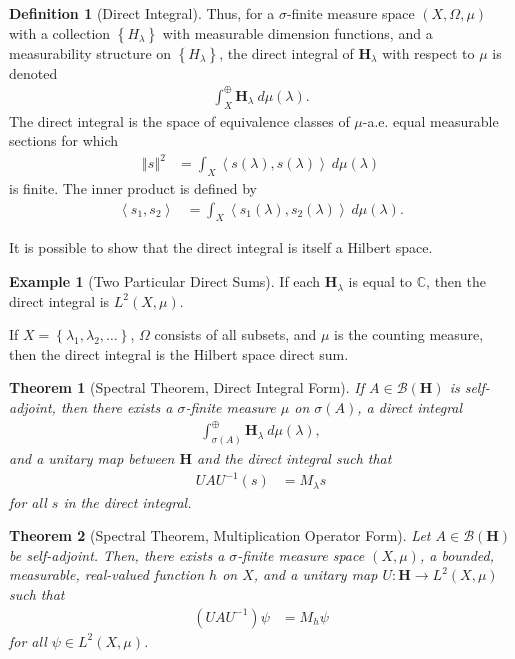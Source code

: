 \documentclass[12pt]{extarticle}
\newcommand{\C}{\mathbb{C}}
\newcommand{\set}[1]{\left\{#1\right\}}
\newcommand{\iprod}[2]{\left\langle #1,#2\right\rangle}
\newcommand{\norm}[1]{\left\Vert #1\right\Vert}
\theoremstyle{plain}
\newtheorem*{theorem}{Theorem}%
\theoremstyle{definition}
\newtheorem*{definition}{Definition}
\newtheorem*{example}{Example}
\theoremstyle{remark}
\renewcommand{\newline}{\hfill\break}
\begin{document}
\begin{definition}[Direct Integral]
    Thus, for a $\sigma$-finite measure space $(X,\Omega,\mu)$ with a collection $\set{H_{\lambda}}$ with measurable dimension functions, and a measurability structure on $\set{H_{\lambda}}$, the direct integral of $\mathbf{H}_{\lambda}$ with respect to $\mu$ is denoted
    \begin{align*}
      \int_{X}^{\oplus} \mathbf{H}_{\lambda}\:d\mu(\lambda).
    \end{align*}
    The direct integral is the space of equivalence classes of $\mu$-a.e. equal measurable sections for which
    \begin{align*}
      \norm{s}^2 &= \int_{X}^{} \iprod{s(\lambda)}{s(\lambda)}\:d\mu(\lambda)
    \end{align*}
    is finite. The inner product is defined by
    \begin{align*}
      \iprod{s_1}{s_2} &= \int_{X}^{} \iprod{s_1(\lambda)}{s_2(\lambda)}\:d\mu(\lambda).
    \end{align*}
  \end{definition}
  It is possible to show that the direct integral is itself a Hilbert space.
  \begin{example}[Two Particular Direct Sums]
    If each $\mathbf{H}_{\lambda}$ is equal to $\C$, then the direct integral is $L^{2}\left(X,\mu\right)$.\newline

    If $X = \set{\lambda_1,\lambda_2,\dots}$, $\Omega$ consists of all subsets, and $\mu$ is the counting measure, then the direct integral is the Hilbert space direct sum.
  \end{example}
  \begin{theorem}[Spectral Theorem, Direct Integral Form]
    If $A \in \mathcal{B}\left(\mathbf{H}\right)$ is self-adjoint, then there exists a $\sigma$-finite measure $\mu$ on $\sigma(A)$, a direct integral
    \begin{align*}
      \int_{\sigma(A)}^{\oplus} \mathbf{H}_{\lambda}\:d\mu(\lambda),
    \end{align*}
    and a unitary map between $\mathbf{H}$ and the direct integral such that
    \begin{align*}
      UAU^{-1}(s) &= M_{\lambda}s
    \end{align*}
    for all $s$ in the direct integral.
  \end{theorem}
  \begin{theorem}[Spectral Theorem, Multiplication Operator Form]
    Let $A\in \mathcal{B}\left(\mathbf{H}\right)$ be self-adjoint. Then, there exists a $\sigma$-finite measure space $(X,\mu)$, a bounded, measurable, real-valued function $h$ on $X$, and a unitary map $U: \mathbf{H}\rightarrow L^{2}(X,\mu)$ such that
    \begin{align*}
      \left(UAU^{-1}\right)\psi &= M_{h}\psi
    \end{align*}
    for all $\psi \in L^{2}\left(X,\mu\right)$.
  \end{theorem}
\end{document}
